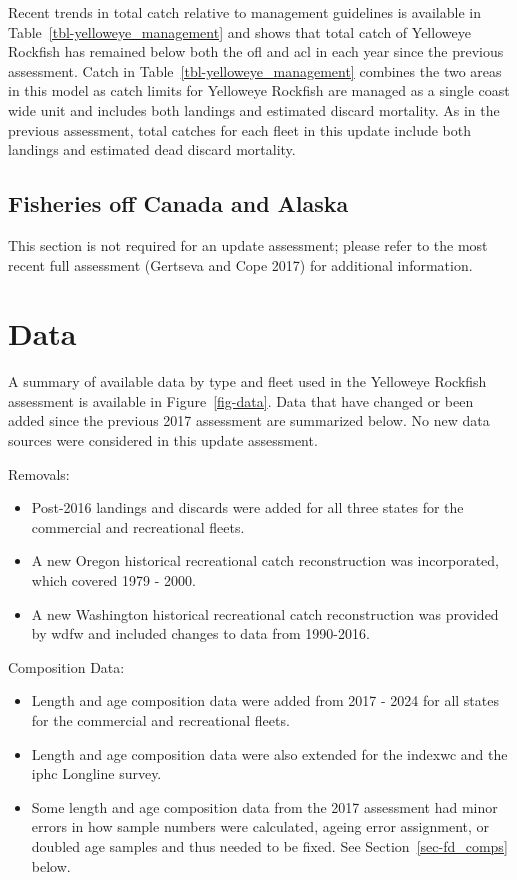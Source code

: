 \documentclass[
]{scrartcl}
\providecommand{\tightlist}{%
  \setlength{\itemsep}{0pt}\setlength{\parskip}{0pt}}\usepackage{longtable,booktabs,array}
\begin{document}
Recent trends in total catch relative to management guidelines is
available in Table~\ref{tbl-yelloweye_management} and shows that total
catch of Yelloweye Rockfish has remained below both the \gls{ofl} and
\gls{acl} in each year since the previous assessment. Catch in
Table~\ref{tbl-yelloweye_management} combines the two areas in this
model as catch limits for Yelloweye Rockfish are managed as a single
coast wide unit and includes both landings and estimated discard
mortality. As in the previous assessment, total catches for each fleet
in this update include both landings and estimated dead discard
mortality.

\subsection{Fisheries off Canada and
Alaska}\label{fisheries-off-canada-and-alaska}

This section is not required for an update assessment; please refer to
the most recent full assessment (Gertseva and Cope 2017) for additional
information.

\newpage{}

\section{Data}\label{sec-data}

A summary of available data by type and fleet used in the Yelloweye
Rockfish assessment is available in Figure~\ref{fig-data}. Data that
have changed or been added since the previous 2017 assessment are
summarized below. No new data sources were considered in this update
assessment.

Removals:

\begin{itemize}
\tightlist
\item
  Post-2016 landings and discards were added for all three states for
  the commercial and recreational fleets.
\item
  A new Oregon historical recreational catch reconstruction was
  incorporated, which covered 1979 - 2000.
\item
  A new Washington historical recreational catch reconstruction was
  provided by \gls{wdfw} and included changes to data from 1990-2016.
\end{itemize}

Composition Data:

\begin{itemize}
\tightlist
\item
  Length and age composition data were added from 2017 - 2024 for all
  states for the commercial and recreational fleets.
\item
  Length and age composition data were also extended for the
  \gls{indexwc} and the \gls{iphc} Longline survey.
\item
  Some length and age composition data from the 2017 assessment had
  minor errors in how sample numbers were calculated, ageing error
  assignment, or doubled age samples and thus needed to be fixed. See
  Section~\ref{sec-fd_comps} below.
\end{itemize}
\end{document}

